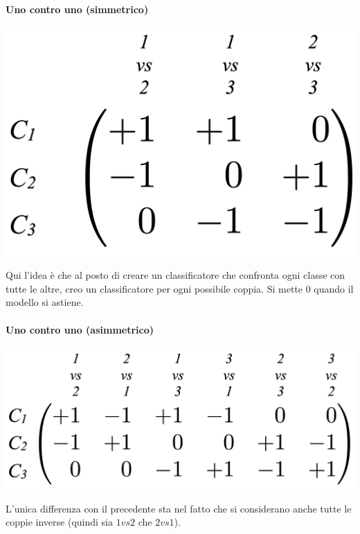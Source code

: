 \paragraph{Uno contro uno (simmetrico)}
\begin{center}
    \includegraphics[scale=0.4]{images/matrixSymm.png}    
\end{center}

Qui l'idea è che al posto di creare un classificatore che confronta ogni classe con tutte le altre, creo un classificatore per ogni possibile coppia. Si mette 0 quando il modello si astiene.

\paragraph{Uno contro uno (asimmetrico)}
\begin{center}
    \includegraphics[scale=0.4]{images/matrixAsymm.png}    
\end{center}

L'unica differenza con il precedente sta nel fatto che si considerano anche tutte le coppie inverse (quindi sia $1vs2$ che $2vs1$).

\newpage


